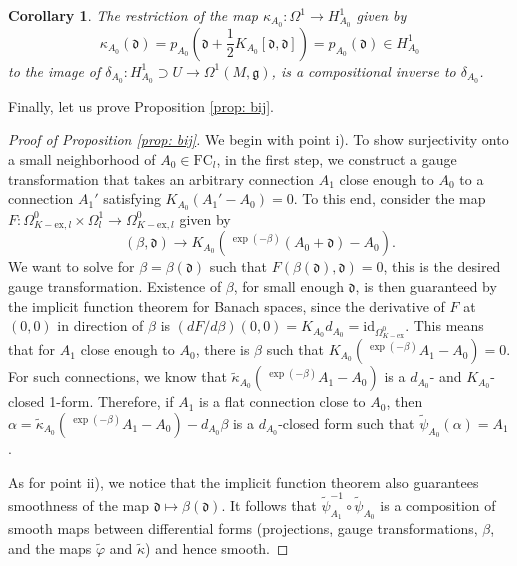 \documentclass[11pt,a4paper]{amsart}
\theoremstyle{plain} %
\newtheorem{cor}[thm]{Corollary}
\theoremstyle{definition}
\theoremstyle{remark}
\newcommand{\g}{\mathfrak{g}}
\newcommand{\mr}{\mathrm}
\newcommand{\til}{\widetilde}
\newcommand{\FC}{\mathrm{FC}}
\newcommand{\ddd}{\mathfrak{d}}
\begin{document}
\begin{cor}
The restriction of the map $\kappa_{A_0}\colon\Omega^1 \to H^1_{A_0}$ given by
\begin{equation}
\kappa_{A_0}(\ddd) = p_{A_0}(\ddd + \frac{1}{2}K_{A_0}[\ddd,\ddd]) = p_{A_0}(\ddd)\in H^1_{A_0}
\end{equation}
to the image of $\delta_{A_0}\colon H^1_{A_0}\supset U \to {\Omega^1(M,\g)}$, is a compositional inverse to $\delta_{A_0}$. %
\end{cor} 
Finally, let us prove Proposition \ref{prop: bij}. 
\begin{proof}[Proof of Proposition \ref{prop: bij}]
We begin with point i). 
   To show surjectivity onto a small neighborhood of 
   $A_0 \in \FC_l$, in the first step, we construct a gauge transformation that takes an arbitrary connection $A_1$ close enough to $A_0$ to a 
   connection $A_1'$ satisfying $K_{A_0}(A_1'-A_0)=0$.
   To this end, consider the map
    $F \colon\Omega^0_{K-\mr{ex}, l} \times \Omega^1_l \to \Omega^0_{K-\mr{ex},l}$ given by 
    $$ (\beta, \ddd) \to K_{A_0}(\, {}^{\exp(-\beta)}(A_0 + \ddd) - A_0 ). $$
    We want to solve for $\beta = \beta(\ddd)$ such that 
    $F(\beta(\ddd),\ddd) = 0$,
    this is the desired gauge transformation. Existence of $\beta$, for small enough $\ddd$, is then guaranteed by the implicit function theorem for Banach spaces, since the derivative of $F$ at $(0,0)$ in direction of $\beta$ is $(dF/d\beta)(0,0) = K_{A_0}d_{A_0} = \mr{id}_{\Omega^0_{K-\mr{ex}}}$. 
    This means that for $A_1$ close enough to $A_0$, there is $\beta$ such that $K_{A_0}(\,{}^{\exp(-\beta)}A_1-A_0) = 0$. For such connections, we know that $\til{\kappa}_{A_0}(\,{}^{\exp(-\beta)}A_1-A_0)$ is a $d_{A_0}$- and $K_{A_0}$-closed 1-form. Therefore, if $A_1$ is a flat connection close to $A_0$, then 
    $\alpha = \til\kappa_{A_0}(\,{}^{\exp(-\beta)}A_1-A_0) -  d_{A_0}\beta$ 
    is a $d_{A_0}$-closed form such that $\til{\psi}_{A_0}(\alpha) = A_1$.
    
As for point ii), we notice that the implicit function theorem also guarantees smoothness of the map $\ddd \mapsto \beta(\ddd)$. It follows that $\til\psi_{A_1}^{-1} \circ \til\psi_{A_0}$ is a composition of smooth maps between differential forms (projections, gauge transformations, $\beta$, and the maps $\til\varphi$ and $\til\kappa$) and hence smooth. 
\end{proof}
\end{document}
